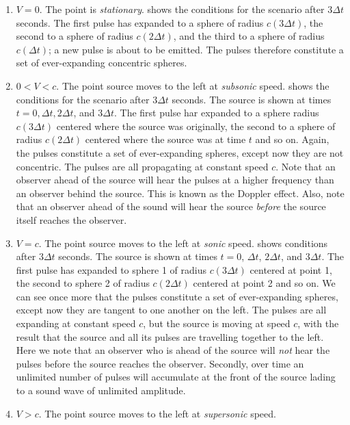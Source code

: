 \begin{enumerate}
  \item $V = 0$.
    The point is \textit{stationary}.
     shows the conditions for the scenario after $3 \Delta t$ seconds.
    The first pulse has expanded to a sphere of radius $c (3 \Delta t)$, the second to a sphere of radius $c (2 \Delta t)$, and the third to a sphere of radius $c(\Delta t)$; a new pulse is about to be emitted.
    The pulses therefore constitute a set of ever-expanding concentric spheres.
  \item $0 < V < c$.
    The point source moves to the left at \textit{subsonic} speed.
     shows the conditions for the scenario after $3 \Delta t$ seconds.
    The source is shown at times $t = 0, \Delta t, 2 \Delta t$, and $3 \Delta t$.
    The first pulse har expanded to a sphere radius $c (3 \Delta t)$ centered where the source was originally, the second to a sphere of radius $c(2\Delta t)$ centered where the source was at time $t$ and so on.
    Again, the pulses constitute a set of ever-expanding spheres, except now they are not concentric.
    The pulses are all propagating at constant speed $c$.
    Note that an observer ahead of the source will hear the pulses at a higher frequency than an observer behind the source.
    This is known as the Doppler effect.
    Also, note that an observer ahead of the sound will hear the source \textit{before} the source itself reaches the observer.
  \item $V = c$.
    The point source moves to the left at \textit{sonic} speed.
     shows conditions after $3\Delta t$ seconds.
    The source is shown at times $t = 0$, $\Delta t$, $2 \Delta t$, and $3 \Delta t$.
    The first pulse has expanded to sphere 1 of radius $c (3\Delta t)$ centered at point 1, the second to sphere 2 of radius $c(2\Delta t)$ centered at point 2 and so on.
    We can see once more that the pulses constitute a set of ever-expanding spheres, except now they are tangent to one another on the left.
    The pulses are all expanding at constant speed $c$, but the source is moving at speed $c$, with the result that the source and all its pulses are travelling together to the left.
    Here we note that an observer who is ahead of the source will \textit{not} hear the pulses before the source reaches the observer.
    Secondly, over time an unlimited number of pulses will accumulate at the front of the source lading to a sound wave of unlimited amplitude.
  \item $V>c$.
    The point source moves to the left at \textit{supersonic} speed.

\end{enumerate}
